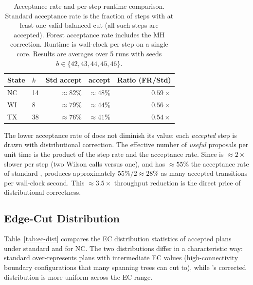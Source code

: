 \begin{table}[ht]
\centering
\caption{Acceptance rate and per-step runtime comparison.
  Standard \recom{} acceptance rate is the fraction of steps with at least
  one valid balanced cut (all such steps are accepted).
  Forest \recom{} acceptance rate includes the MH correction.
  Runtime is wall-clock per step on a single core.
  Results are averages over 5 runs with seeds $b \in \{42, 43, 44, 45, 46\}$.}
\label{tab:acceptance}
\renewcommand{\arraystretch}{1.35}
\begin{tabular}{@{}llrrr@{}}
\toprule
State & $k$ & Std \recom{} accept & \fr{} accept & Ratio (FR/Std) \\
\midrule
NC & 14 & $\approx\!82\%$ & $\approx\!48\%$ & $0.59\times$ \\
WI &  8 & $\approx\!79\%$ & $\approx\!44\%$ & $0.56\times$ \\
TX & 38 & $\approx\!76\%$ & $\approx\!41\%$ & $0.54\times$ \\
\bottomrule
\end{tabular}
\end{table}

The lower acceptance rate of \fr{} does not diminish its value: each
\emph{accepted} step is drawn with distributional correction.
The effective number of \emph{useful} proposals per unit time is the product
of the step rate and the acceptance rate.
Since \fr{} is $\approx\!2\times$ slower per step (two Wilson \ust{} calls
versus one), and has $\approx\!55\%$ the acceptance rate of standard \recom{},
\fr{} produces approximately $55\% / 2 \approx\!28\%$ as many accepted
transitions per wall-clock second.
This $\approx\!3.5\times$ throughput reduction is the direct price of
distributional correctness.

\subsection{Edge-Cut Distribution}

Table~\ref{tab:ec-dist} compares the EC distribution statistics of
accepted plans under standard \recom{} and \fr{} for NC.
The two distributions differ in a characteristic way: standard \recom{}
over-represents plans with intermediate EC values (high-connectivity
boundary configurations that many spanning trees can cut to), while \fr{}'s
corrected distribution is more uniform across the EC range.

